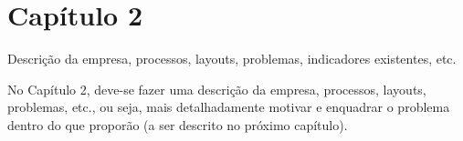 \chapter{Capítulo 2}

Descrição da empresa, processos, layouts, problemas, indicadores existentes, etc.

No Capítulo 2, deve-se fazer uma descrição da empresa, processos, layouts, problemas, etc., ou seja, mais detalhadamente motivar e enquadrar o problema dentro do que proporão (a ser descrito no próximo capítulo).